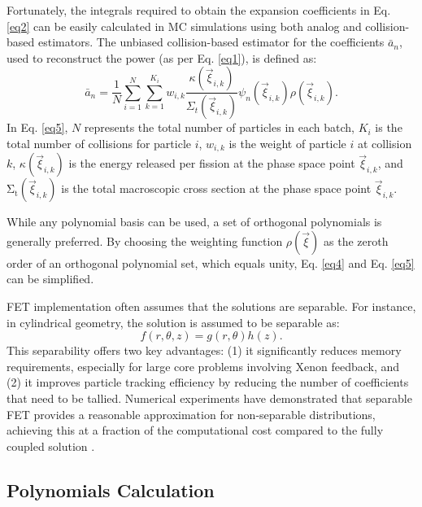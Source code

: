 Fortunately, the integrals required to obtain the expansion coefficients in Eq. \ref{eq2} can be easily calculated in MC simulations using both analog and collision-based estimators. The unbiased collision-based estimator for the coefficients ${\bar{a}}_n$, used to reconstruct the power (as per Eq. \ref{eq1}), is defined as:
\begin{equation}
    {\bar{a}}_n=\frac{1}{N}\sum_{i=1}^{N}{\sum_{k=1}^{K_i}{w_{i,k}\frac{\kappa\left({\vec{\xi}}_{i,k}\right)}{\Sigma_t\left({\vec{\xi}}_{i,k}\right)}}\psi_n\left({\vec{\xi}}_{i,k}\right)\rho\left({\vec{\xi}}_{i,k}\right)}.
    \label{eq5}
\end{equation}
In Eq. \ref{eq5}, $N$ represents the total number of particles in each batch, $K_i$ is the total number of collisions for particle $i$, $w_{i,k}$ is the weight of particle $i$ at collision $k$, $\kappa\left({\vec{\xi}}_{i,k}\right)$ is the energy released per fission at the phase space point ${\vec{\xi}}_{i,k}$, and $\mathrm{\Sigma}_\mathrm{t}\left({\vec{\xi}}_{i,k}\right)$ is the total macroscopic cross section at the phase space point ${\vec{\xi}}_{i,k}$.

While any polynomial basis can be used, a set of orthogonal polynomials is generally preferred. By choosing the weighting function $\rho\left(\vec{\xi}\right)$ as the zeroth order of an orthogonal polynomial set, which equals unity, Eq. \ref{eq4} and Eq. \ref{eq5} can be simplified.

FET implementation often assumes that the solutions are separable. For instance, in cylindrical geometry, the solution is assumed to be separable as:
\begin{equation}
f\left(r,\theta,z\right)=g\left(r,\theta\right)h\left(z\right).
\end{equation}
This separability offers two key advantages: (1) it significantly reduces memory requirements, especially for large core problems involving Xenon feedback, and (2) it improves particle tracking efficiency by reducing the number of coefficients that need to be tallied. Numerical experiments have demonstrated that separable FET provides a reasonable approximation for non-separable distributions, achieving this at a fraction of the computational cost compared to the fully coupled solution \cite{gries}.

\subsection{Polynomials Calculation} \label{sec22}

